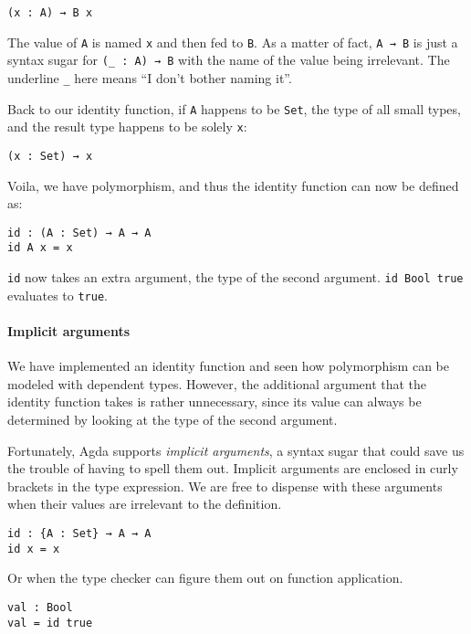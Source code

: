 \documentclass[\main/thesis.tex]{subfiles}
\begin{document}
\begin{lstlisting}
(x : A) → B x
\end{lstlisting}

The value of {\lstinline|A|} is named {\lstinline|x|} and then fed to {\lstinline|B|}.
As a matter of fact, {\lstinline|A → B|} is just a syntax sugar for {\lstinline|(_ : A) → B|}
with the name of the value being irrelevant. The underline {\lstinline|_|} here
means ``I don't bother naming it''.

Back to our identity function, if {\lstinline|A|} happens to be {\lstinline|Set|},
the type of all small types, and the result type happens to be solely {\lstinline|x|}:

\begin{lstlisting}
(x : Set) → x
\end{lstlisting}

Voila, we have polymorphism, and thus the identity function can now be defined as:

\begin{lstlisting}
id : (A : Set) → A → A
id A x = x
\end{lstlisting}

{\lstinline|id|} now takes an extra argument, the type of the second argument.
{\lstinline|id Bool true|} evaluates to {\lstinline|true|}.

\paragraph{Implicit arguments}

We have implemented an identity function and seen how polymorphism can be modeled
with dependent types. However, the additional argument that the identity function
takes is rather unnecessary, since its value can always be determined by looking
at the type of the second argument.

Fortunately, Agda supports \textit{implicit arguments}, a syntax sugar that could
save us the trouble of having to spell them out. Implicit arguments are enclosed
in curly brackets in the type expression. We are free to dispense with these arguments
when their values are irrelevant to the definition.

\begin{lstlisting}
id : {A : Set} → A → A
id x = x
\end{lstlisting}

Or when the type checker can figure them out on function application.

\begin{lstlisting}
val : Bool
val = id true
\end{lstlisting}
\end{document}

